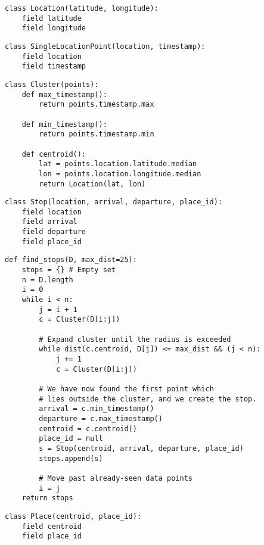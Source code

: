 
\begin{verbatim}
class Location(latitude, longitude):
    field latitude
    field longitude
\end{verbatim}

\begin{verbatim}
class SingleLocationPoint(location, timestamp):
    field location
    field timestamp
\end{verbatim}


\begin{verbatim}
class Cluster(points):
    def max_timestamp():
        return points.timestamp.max
        
    def min_timestamp():
        return points.timestamp.min
        
    def centroid():
        lat = points.location.latitude.median
        lon = points.location.longitude.median
        return Location(lat, lon)
\end{verbatim}

\begin{verbatim}
class Stop(location, arrival, departure, place_id):
    field location
    field arrival
    field departure
    field place_id
\end{verbatim}

\begin{verbatim}
def find_stops(D, max_dist=25):
    stops = {} # Empty set
    n = D.length
    i = 0
    while i < n:
        j = i + 1
        c = Cluster(D[i:j])
        
        # Expand cluster until the radius is exceeded
        while dist(c.centroid, D[j]) <= max_dist && (j < n):
            j += 1
            c = Cluster(D[i:j])
        
        # We have now found the first point which 
        # lies outside the cluster, and we create the stop.
        arrival = c.min_timestamp()
        departure = c.max_timestamp()
        centroid = c.centroid()
        place_id = null
        s = Stop(centroid, arrival, departure, place_id) 
        stops.append(s)
        
        # Move past already-seen data points
        i = j
    return stops
\end{verbatim}

\begin{verbatim}
class Place(centroid, place_id):
    field centroid
    field place_id
\end{verbatim}

